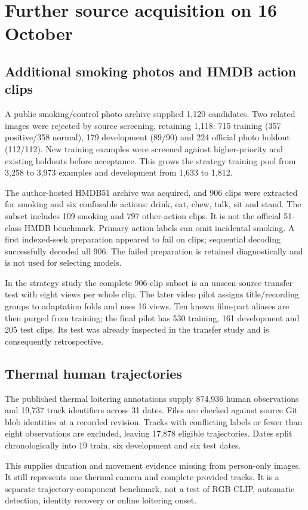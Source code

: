 \section{Further source acquisition on 16 October}
\subsection{Additional smoking photos and HMDB action clips}
A public smoking/control photo archive supplied 1,120 candidates. Two related images were rejected by source screening, retaining 1,118: 715 training (357 positive/358 normal), 179 development (89/90) and 224 official photo holdout (112/112). New training examples were screened against higher-priority and existing holdouts before acceptance. This grows the strategy training pool from 3,258 to 3,973 examples and development from 1,633 to 1,812.

The author-hosted HMDB51 archive was acquired, and 906 clips were extracted for smoking and six confusable actions: drink, eat, chew, talk, sit and stand. The subset includes 109 smoking and 797 other-action clips. It is not the official 51-class HMDB benchmark. Primary action labels can omit incidental smoking. A first indexed-seek preparation appeared to fail on clips; sequential decoding successfully decoded all 906. The failed preparation is retained diagnostically and is not used for selecting models.

In the strategy study the complete 906-clip subset is an unseen-source transfer test with eight views per whole clip. The later video pilot assigns title/recording groups to adaptation folds and uses 16 views. Ten known film-part aliases are then purged from training; the final pilot has 530 training, 161 development and 205 test clips. Its test was already inspected in the transfer study and is consequently retrospective.

\subsection{Thermal human trajectories}
The published thermal loitering annotations supply 874,936 human observations and 19,737 track identifiers across 31 dates. Files are checked against source Git blob identities at a recorded revision. Tracks with conflicting labels or fewer than eight observations are excluded, leaving 17,878 eligible trajectories. Dates split chronologically into 19 train, six development and six test dates.

This supplies duration and movement evidence missing from person-only images. It still represents one thermal camera and complete provided tracks. It is a separate trajectory-component benchmark, not a test of RGB CLIP, automatic detection, identity recovery or online loitering onset.

